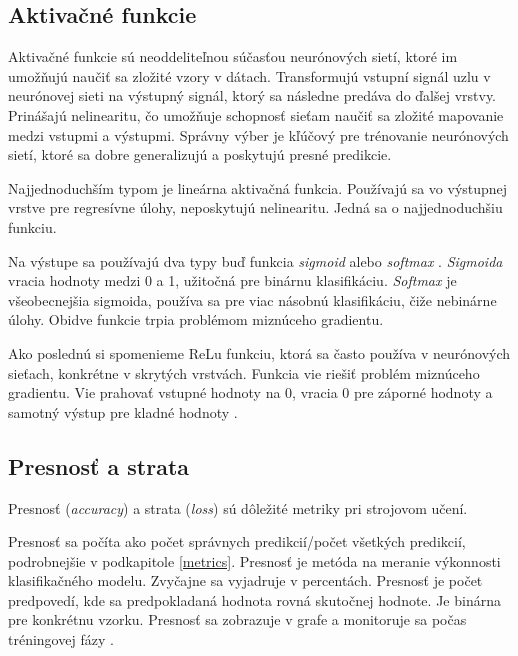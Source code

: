 \subsection{Aktivačné funkcie}
Aktivačné funkcie sú neoddeliteľnou súčasťou neurónových sietí, ktoré im umožňujú naučiť sa zložité vzory v dátach. Transformujú vstupní signál uzlu v neurónovej sieti na výstupný signál, ktorý sa následne predáva do ďalšej vrstvy. Prinášajú nelinearitu, čo umožňuje schopnosť sieťam naučiť sa zložité mapovanie medzi vstupmi a výstupmi. Správny výber je kľúčový pre trénovanie neurónových sietí, ktoré sa dobre generalizujú a poskytujú presné predikcie. 

Najjednoduchším typom je lineárna aktivačná funkcia. Používajú sa vo výstupnej vrstve pre regresívne úlohy, neposkytujú nelinearitu. Jedná sa o najjednoduchšiu funkciu.

Na výstupe sa používajú dva typy buď funkcia \textit{sigmoid} \cite{aktivacne} alebo \textit{softmax} \cite{aktivacne}. \textit{Sigmoida} vracia hodnoty medzi 0 a 1, užitočná pre binárnu klasifikáciu. \textit{Softmax} je všeobecnejšia sigmoida, používa sa pre viac násobnú klasifikáciu, čiže nebinárne úlohy. Obidve funkcie trpia problémom miznúceho gradientu.

Ako poslednú si spomenieme ReLu funkciu, ktorá sa často používa v neurónových sieťach, konkrétne v skrytých vrstvách. Funkcia vie riešiť problém miznúceho gradientu. Vie prahovať vstupné hodnoty na 0, vracia 0 pre záporné hodnoty a samotný výstup pre kladné hodnoty \cite{aktivacne}.

\subsection{Presnosť a strata}
Presnosť (\textit{accuracy}) a strata (\textit{loss}) sú dôležité metriky pri strojovom učení.

Presnosť sa počíta ako počet správnych predikcií/počet všetkých predikcií, podrobnejšie v podkapitole \ref{metrics}. Presnosť je metóda na meranie výkonnosti klasifikačného modelu. Zvyčajne sa vyjadruje v percentách. Presnosť je počet predpovedí, kde sa predpokladaná hodnota rovná skutočnej hodnote. Je binárna pre konkrétnu vzorku. Presnosť sa zobrazuje v grafe a monitoruje sa počas tréningovej fázy \cite{acc_loss}.

